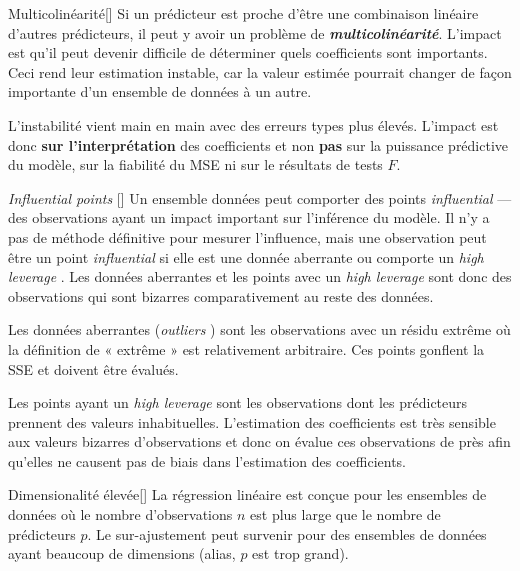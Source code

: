 \documentclass[french]{article}
\begin{document}
\begin{multicols*}{2}
\begin{definitionGENERAL}{\hypertarget{multicolin}{Multicolinéarité}}[]
Si un prédicteur est proche d'être une combinaison linéaire d'autres prédicteurs, il peut y avoir un problème de \textbf{\textit{multicolinéarité}}. L'impact est qu'il peut devenir difficile de déterminer quels coefficients sont importants. Ceci rend leur estimation instable, car la valeur estimée pourrait changer de façon importante d'un ensemble de données à un autre.

\bigskip

L'instabilité vient main en main avec des erreurs types plus élevés. L'impact est donc \textbf{sur l'interprétation} des coefficients et non \textbf{pas} sur la puissance prédictive du modèle, sur la fiabilité du MSE ni sur le résultats de tests $F$.
\end{definitionGENERAL}

\begin{definitionGENERAL}{\og \textit{Influential points} \fg{}}[]
Un ensemble données peut comporter des points \og \textit{influential} \fg{}---des observations ayant un impact important sur l'inférence du modèle. Il n'y a pas de méthode définitive pour mesurer l'influence, mais une observation peut être un point \og \textit{influential} \fg{} si elle est une donnée aberrante ou comporte un \og \textit{high leverage} \fg{}. Les données aberrantes et les points avec un \og \textit{high leverage} \fg{} sont donc des observations qui sont bizarres comparativement au reste des données. 

\bigskip

Les données aberrantes (\og \textit{outliers} \fg{}) sont les observations avec un résidu extrême où la définition de « extrême » est relativement arbitraire. Ces points gonflent la SSE et doivent être évalués.

\bigskip

Les points ayant un \og \textit{high leverage} \fg{} sont les observations dont les prédicteurs prennent des valeurs inhabituelles. L'estimation des coefficients est très sensible aux valeurs bizarres d'observations et donc on évalue ces observations de près afin qu'elles ne causent pas de biais dans l'estimation des coefficients.
\end{definitionGENERAL}

\begin{definitionGENERAL}{\hypertarget{multidimProb}{Dimensionalité élevée}}[]
La régression linéaire est conçue pour les ensembles de données où le nombre d'observations $n$ est plus large que le nombre de prédicteurs $p$. Le sur-ajustement peut survenir pour des ensembles de données ayant beaucoup de dimensions (alias, $p$ est trop grand).


\end{definitionGENERAL}
\end{multicols*}
\end{document}
